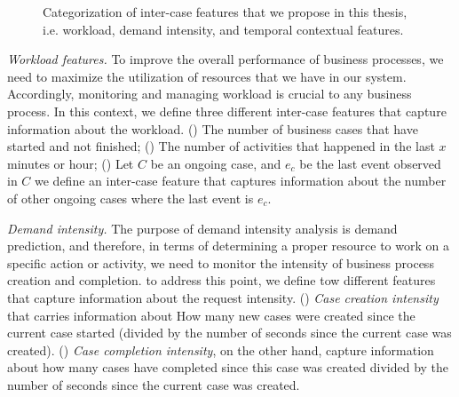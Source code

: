 \begin{figure}[htb]
	\begin{center}
		\caption[Inter-case features]{Categorization of inter-case features that we propose in this thesis, i.e. workload, demand intensity, and temporal contextual features.
		}
		\label{fig:inter1}
	\end{center}
\end{figure}

\textit{Workload features.} To improve the overall performance of business processes, we need to maximize the utilization of resources that we have in our system. Accordingly, monitoring and managing workload is crucial to any business process. In this context, we define three different inter-case features that capture information about the workload. () The number of business cases that have started and not finished; () The number of activities that happened in the last $x$ minutes or hour; () Let $C$ be an ongoing case, and  $e_c$ be the last event observed in $C$  we define an inter-case feature that captures information about the number of other ongoing cases where the last event is $e_c$.

\textit{Demand intensity.} The purpose of demand intensity analysis is demand prediction, and therefore, in terms of determining a proper resource to work on a specific action or activity, we need to monitor the intensity of business process creation and completion.   to address this point, we define tow different features that capture information about the request intensity. () \textit{Case creation intensity} that carries information about How many new cases were created since the current case started (divided by the number of seconds since the current case was created). () \textit{Case completion intensity}, on the other hand, capture information about how many cases have completed since this case was created divided by the number of seconds since the current case was created.


